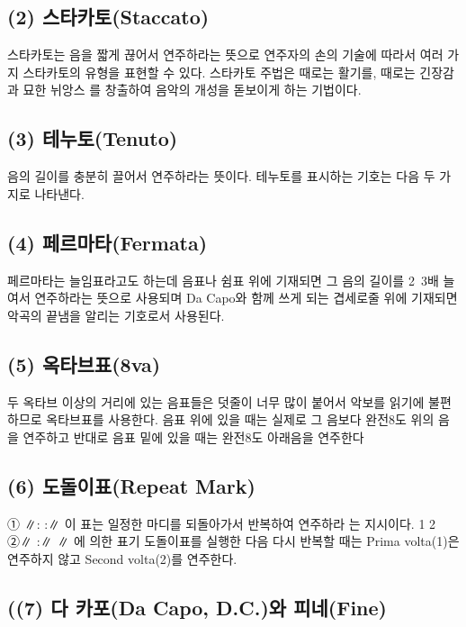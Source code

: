 \documentclass[12pt, a4paper, oneside]{book}
\begin{document}
	\subsection{(2) 스타카토(Staccato)}

스타카토는 음을 짧게 끊어서 연주하라는 뜻으로 연주자의 손의
기술에 따라서 여러 가지 스타카토의 유형을 표현할 수 있다.
스타카토 주법은 때로는 활기를, 때로는 긴장감과 묘한 뉘앙스
를 창출하여 음악의 개성을 돋보이게 하는 기법이다.



	\subsection{(3) 테누토(Tenuto)}

음의 길이를 충분히 끌어서 연주하라는 뜻이다.
테누토를 표시하는 기호는 다음 두 가지로 나타낸다.

	\subsection{(4) 페르마타(Fermata)}

페르마타는 늘임표라고도 하는데 음표나 쉼표 위에 기재되면
그 음의 길이를 2~3배 늘여서 연주하라는 뜻으로 사용되며
Da Capo와 함께 쓰게 되는 겹세로줄 위에 기재되면 악곡의
끝냄을 알리는 기호로서 사용된다.

	\subsection{(5) 옥타브표(8va)}

두 옥타브 이상의 거리에 있는 음표들은 덧줄이 너무 많이
붙어서 악보를 읽기에 불편하므로 옥타브표를 사용한다.
음표 위에 있을 때는 실제로 그 음보다 완전8도 위의 음을
연주하고 반대로 음표 밑에 있을 때는 완전8도 아래음을 연주한다


	\subsection{(6) 도돌이표(Repeat Mark)}
① ∥: :∥ 이 표는 일정한 마디를 되돌아가서 반복하여 연주하라
는 지시이다.
1 2
②∥ :∥ ∥ 에 의한 표기
도돌이표를 실행한 다음 다시 반복할 때는 Prima volta(1)은
연주하지 않고 Second volta(2)를 연주한다.

	\subsection{((7) 다 카포(Da Capo, D.C.)와 피네(Fine)}
\end{document}

